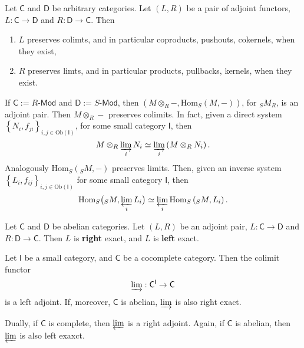 \begin{prop}
	Let $\mathsf{C}$ and $\mathsf{D}$ be arbitrary categories.
	Let $\left(L, R\right)$ be a pair of adjoint functors, $L: \mathsf{C} \to \mathsf{D}$ and
	$R: \mathsf{D} \to \mathsf{C}$.
	Then
	\begin{enumerate}
		\item $L$ preserves colimts, and in particular coproducts, pushouts, cokernels,
			when they exist,
		\item $R$ preserves limts, and in particular products, pullbacks, kernels,
			when they exist.
	\end{enumerate}
\end{prop} 

\begin{ex}
	If $\mathsf{C} := R\text{-}\mathsf{Mod}$ and $\mathsf{D}:= S\text{-}\mathsf{Mod}$, then
	$\left(M \otimes_R -, \mathrm{Hom}_{S}\left( M, - \right)\right)$, for ${}_SM_R$, is an adjoint pair.
	Then $M \otimes_R -$ preserves colimits.
	In fact, given a direct system $\left\{N_i, f_{ji}\right\}_{i, j \in \mathrm{Ob} \left(\mathsf{I}\right)}$, 
	for some small category $\mathsf{I}$, then
	\begin{equation}
		M \otimes_R \varinjlim_i N_i \simeq \varinjlim_i \left( M \otimes_R N_i \right)
	.\end{equation} 
	Analogously $\mathrm{Hom}_{S}\left( {}_S M, - \right)$ preserves limits.
	Then, given an inverse system $\left\{ L_i, f_{ij} \right\}_{i,j \in \mathrm{Ob} \left(\mathsf{I}\right)}$
	for some small category $\mathsf{I}$, then
	\begin{equation}
		\mathrm{Hom}_{S}\big( {}_S M, \varprojlim_i L_i \big) \simeq
		\varprojlim_i \mathrm{Hom}_{ S}\left( {}_S M, L_i \right)
	.\end{equation} 
\end{ex} 

\begin{rem}
	Let $\mathsf{C}$ and $\mathsf{D}$ be abelian categories.
	Let $\left(L, R\right)$ be an adjoint pair, $L: \mathsf{C} \to \mathsf{D}$ and $R: \mathsf{D} \to \mathsf{C}$.
	Then $L$ is \textbf{right} exact, and $L$ is \textbf{left} exact.
\end{rem}

\begin{prop}
	Let $\mathsf{I}$ be a small category, and $\mathsf{C}$ be a cocomplete category.
	Then the colimit functor
	\begin{equation}
	\varinjlim: \mathsf{C}^{\mathsf{I}} \to \mathsf{C}
	\end{equation} 
	is a left adjoint.
	If, moreover, $\mathsf{C}$ is abelian, $\varinjlim$ is also right exact.

	Dually, if $\mathsf{C}$ is complete, then $\varprojlim$	is a right adjoint.
	Again, if $\mathsf{C}$ is abelian, then $\varprojlim$ is also left exaxct.
\end{prop} 
